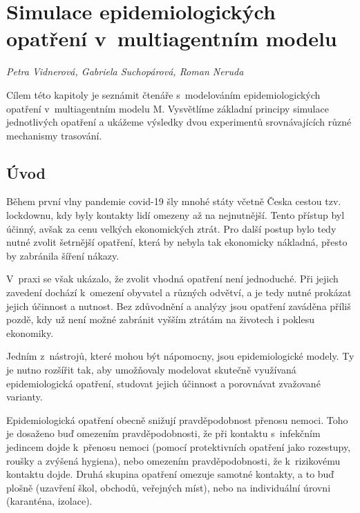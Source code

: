 
\chapter[Simulace v~multiagentním modelu]{Simulace epidemiologických opatření v~multiagentním modelu}
\label{Evaluace_politik}

\textit{Petra Vidnerová, Gabriela Suchopárová, Roman Neruda}
\vspace{15mm}

Cílem této kapitoly je seznámit čtenáře s~modelováním
epidemiologických o\-pat\-ře\-ní v~multiagentním modelu M. Vysvětlíme
základní principy simulace jednotlivých opatření a ukážeme výsledky
dvou experimentů srovnávajících různé mechanismy trasování.


\section*{Úvod}

Během první vlny pandemie covid-19 šly mnohé státy včetně Česka
cestou tzv. lockdownu, kdy byly kontakty lidí omezeny až na
nejnutnější. Tento přístup byl účinný, avšak za cenu velkých
ekonomických ztrát. Pro další postup bylo tedy nutné zvolit šetrnější
opatření, která by nebyla tak ekonomicky nákladná, přesto by zabránila
šíření nákazy.

V~praxi se však ukázalo, že zvolit vhodná opatření není
jednoduché. Při jejich zavedení dochází k~omezení obyvatel a různých
odvětví, a je tedy nutné prokázat jejich účinnost a nutnost. Bez
zdůvodnění a analýzy jsou opatření zaváděna příliš pozdě, kdy už není
možné zabránit vyšším ztrátám na životech i poklesu ekonomiky.

Jedním z~nástrojů, které mohou být nápomocny, jsou epidemiologické
modely. Ty je nutno rozšířit tak, aby umožňovaly modelovat skutečně
využívaná epidemiologická opatření, studovat jejich účinnost a
porovnávat zvažované varianty.

Epidemiologická opatření obecně snižují pravděpodobnost přenosu nemoci. Toho
je dosaženo buď omezením pravděpodobnosti, že při kontaktu s~infekčním jedincem
dojde k~přenosu nemoci (pomocí protektivních opatření jako rozestupy, roušky
a zvýšená hygiena), nebo omezením pravděpodobnosti, že k~rizikovému kontaktu
dojde. Druhá skupina opatření omezuje samotné kontakty, a to buď plošně
(uzavření škol, obchodů, veřejných míst), nebo na individuální úrovni
(karanténa, izolace).




